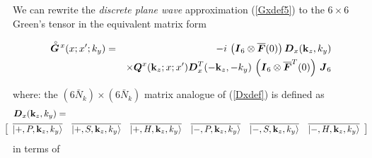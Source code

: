 We can  rewrite the {\em discrete plane wave\/} 
approximation (\ref{Gxdef5}) to the $6 \times 6$ Green's tensor in the equivalent matrix 
form
\begin{samepage}
\begin{eqnarray} \label{superGx}
\stackrel{\scriptscriptstyle _{\,\,\circ}}{ \mbox{\boldmath$\mit G$\unboldmath}}\!{}^{x}({ x};{ x}^{\prime};k_y)
&=&- i\, 
\left({\mbox{\boldmath$\mit I$\unboldmath}}_6\otimes \overline{\mbox{\boldmath$\mit F$\unboldmath}}(0)  \right)
 {\mbox{\boldmath$\mit D$\unboldmath}}_{x}({\bf k}_{z},{k}_{y})\nonumber\\
&&\times
{\mbox{\boldmath$\mit Q$\unboldmath}}^{x}({\bf k}_{z};x;x^{\prime}){\mbox{\boldmath$\mit D$\unboldmath}}_{x}^{T}(-{\bf k}_{z},-{k}_{y})
\,\left({\mbox{\boldmath$\mit I$\unboldmath}}_6\otimes \overline{\mbox{\boldmath$\mit F$\unboldmath}}^{T}(0)  \right)\,{\mbox{\boldmath$\mit J$\unboldmath}}_6
\end{eqnarray} 
\end{samepage}
where:\newline
the $(6\bar{N}_k)\times (6\bar{N}_k)$ matrix analogue of (\ref{Dxdef}) is defined 
as
\begin{eqnarray} \label{Dxsuperdef}
\lefteqn{{\bmi D}_{x}({\bf k}_{z},k_{y})=}\\
&&\!\!\!\!\!\!\!\!\!\!\!\!
\left[\begin{array}{cccccc}
\overline{\left|+,P, {\bf k}_{z},k_{y}  \right\rangle}&\overline{\left|+,S, {\bf k}_{z},k_{y}  
\right\rangle}&\overline{\left|+,H, {\bf k}_{z},k_{y}  \right\rangle}&
\overline{\left|-,P, {\bf k}_{z},k_{y}  \right\rangle}&\overline{\left|-,S, {\bf k}_{z},k_{y}  
\right\rangle}&\overline{\left|-,H, {\bf k}_{z},k_{y}  \right\rangle}
\end{array}\right]\nonumber
\end{eqnarray}
in terms of
